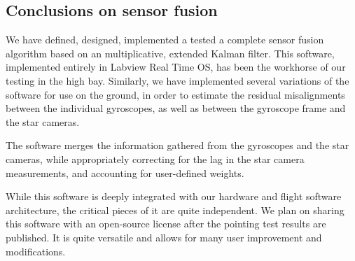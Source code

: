 \subsection{Conclusions on sensor fusion}

We have defined, designed, implemented a tested a complete sensor fusion algorithm based on an multiplicative, extended Kalman filter. This software, implemented entirely in Labview Real Time OS, has been the workhorse of our testing in the high bay. Similarly, we have implemented several variations of the software for use on the ground, in order to estimate the residual misalignments between the individual gyroscopes, as well as between the gyroscope frame and the star cameras.

The software merges the information gathered from the gyroscopes and the star cameras, while appropriately correcting for the lag in the star camera measurements, and accounting for user-defined weights. 

While this software is deeply integrated with our hardware and flight software architecture, the critical pieces of it are quite independent. We plan on sharing this software with an open-source license after the pointing test results are published. It is quite versatile and allows for many user improvement and modifications.